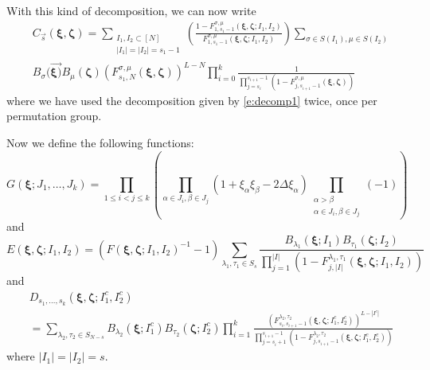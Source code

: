 \documentclass[a4paper,11pt]{article}
\theoremstyle{definition}
\begin{document}
With this kind of decomposition, we can now write
\begin{equation}\label{e:CsDecomp1}
\begin{split}
    &C_{\vec{s}}(\boldsymbol{\xi},\boldsymbol{\zeta})= \sum_{\substack{I_1,I_2 \subset [N]\\|I_1| = |I_2| = s_1-1}} \left(\frac{1-F_{1,s_1-1}^{\sigma,\mu}(\boldsymbol{\xi},\boldsymbol{\zeta};I_1,I_2)}{F_{1,s_1-1}^{\sigma,\mu}(\boldsymbol{\xi},\boldsymbol{\zeta};I_1,I_2)}\right) \sum_{\sigma \in S(I_1), \mu \in S(I_2)}  \\
    &B_\sigma(\vec{\boldsymbol{\xi})}B_\mu(\boldsymbol{\zeta})\left(F_{s_1,N}^{\sigma,\mu}(\boldsymbol{\xi},\boldsymbol{\zeta})\right)^{L-N} \prod_{i=0}^k\frac{1}{\prod_{j=s_i}^{s_{i+1}-1}\left(1-F_{j,s_{i+1}-1}^{\sigma,\mu}(\boldsymbol{\xi},\boldsymbol{\zeta})\right)}
\end{split}
\end{equation}
where we have used the decomposition given by \eqref{e:decomp1} twice, once per permutation group. 

Now we define the following functions:
\begin{equation}\label{oneptGfxn}
    G(\boldsymbol{\xi};J_1, \dots, J_k) = \prod_{1 \leq i < j \leq k} \left(\prod_{\alpha \in J_i, \beta\in J_j}(1 + \xi_{\alpha} \xi_{\beta} - 2\Delta \xi_{\alpha}) \prod_{\substack{\alpha>\beta\\ \alpha \in J_i, \beta \in J_j}}(-1)\right)
\end{equation}
and
\begin{equation} \label{oneptEfxn}
    E(\boldsymbol{\xi}, \boldsymbol{\zeta}; I_1, I_2) = \left(F(\boldsymbol{\xi},\boldsymbol{\zeta};I_1,I_2)^{-1} -1\right) \sum_{\lambda_1, \tau_1 \in S_{s}} \frac{B_{\lambda_1}(\boldsymbol{\xi}; I_1)B_{\tau_1}(\boldsymbol{\zeta}; I_2)}{\prod_{j=1}^{|I|} (1 - F_{j, |I|}^{\lambda_1, \tau_1}(\boldsymbol{\xi}, \boldsymbol{\zeta}; I_1, I_2))}
\end{equation}
and
\begin{equation} \label{oneptDfxn}
\begin{split}
    &D_{s_1, \dots, s_k}(\boldsymbol{\xi}, \boldsymbol{\zeta}; I_1^c, I_2^c)\\
    &= \sum_{\lambda_2, \tau_2 \in S_{N-s}}B_{\lambda_2}(\boldsymbol{\xi}; I_1^c) B_{\tau_2}(\boldsymbol{\zeta}; I_2^c) \prod_{i=1}^k \frac{(F_{s_i, s_{i+1}-1}^{\lambda_2, \tau_2}(\boldsymbol{\xi}, \boldsymbol{\zeta}; I_1^c, I_2^c))^{L- |I^c|}}{\prod_{j=s_i +1}^{s_{i+1}-1}(1- F_{j, s_{i+1}-1}^{\lambda_2, \tau_2}(\boldsymbol{\xi}, \boldsymbol{\zeta}; I_1^c, I_2^c))}
\end{split}
\end{equation}
where $|I_1| = |I_2| = s$.
\end{document}
